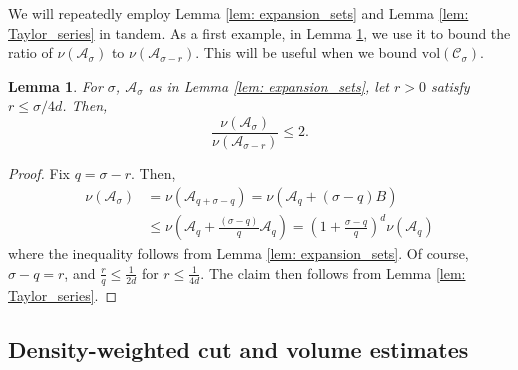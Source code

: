\documentclass{article}
\newcommand{\vol}{\mathrm{vol}}
\newcommand{\1}{\mathbf{1}}
\newcommand{\Cset}{\mathcal{C}}
\newcommand{\Aset}{\mathcal{A}}
\newcommand{\Asig}{\Aset_{\sigma}}
\newcommand{\Csig}{\Cset_{\sigma}}
\theoremstyle{aldenthm}
\newtheorem{lemma}{Lemma}
\begin{document}
We will repeatedly employ Lemma \ref{lem: expansion_sets} and Lemma \ref{lem: Taylor_series} in tandem. As a first example, in Lemma \ref{lem: interior_of_expansion_sets}, we use it to bound the ratio of $\nu(\Asig)$ to $\nu(\Aset_{\sigma - r})$. This will be useful when we bound $\vol(\Csig)$.

\begin{lemma}
	\label{lem: interior_of_expansion_sets}
	For $\sigma$, $\Asig$ as in Lemma \ref{lem: expansion_sets}, let $r > 0$ satisfy $r \leq \sigma/4d$. Then,
	\begin{equation*}
	\frac{\nu(\Asig)}{\nu(\Aset_{\sigma - r})} \leq 2.
	\end{equation*}
\end{lemma}
\begin{proof}
	Fix $q = \sigma - r$. Then,
	\begin{align*}
	\nu(\Asig) & = \nu(\Aset_{q + \sigma - q}) = \nu(\Aset_q + (\sigma - q)B ) \\
	& \leq \nu(\Aset_q + \frac{(\sigma - q)}{q} \Aset_q) = \left(1 + \frac{\sigma - q}{q}\right)^d \nu(\Aset_q)
	\end{align*}
	where the inequality follows from Lemma \ref{lem: expansion_sets}. Of course, $\sigma - q = r$, and $\frac{r}{q} \leq \frac{1}{2d}$ for $r \leq \frac{1}{4d}$. The claim then follows from Lemma \ref{lem: Taylor_series}.
\end{proof}

\subsection{Density-weighted cut and volume estimates}
\label{sec: density_weighted_cut_and_volume_estimates}
\end{document}

